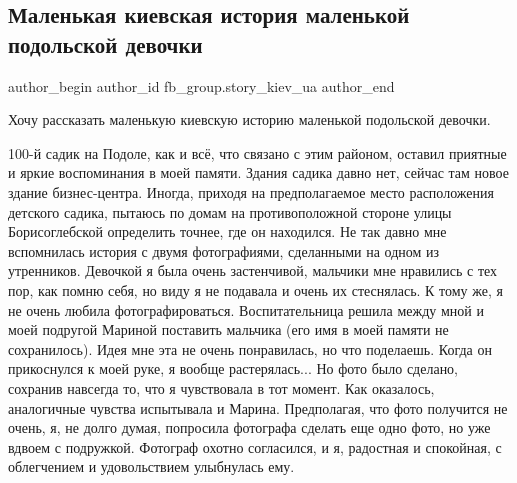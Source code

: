  
 
 
 
 
 
\subsection{Маленькая киевская история маленькой подольской девочки}
\label{sec:20_11_2021.fb.fb_group.story_kiev_ua.2.malenkaja_podolskaja_devochka}
 
\ifcmt
 author_begin
   author_id fb_group.story_kiev_ua
 author_end
\fi

Хочу рассказать маленькую киевскую историю маленькой подольской девочки. 

100-й садик на Подоле, как и всё, что связано с этим районом, оставил приятные
и яркие воспоминания в моей памяти. Здания садика давно нет, сейчас там новое
здание бизнес-центра. Иногда, приходя на предполагаемое место расположения
детского садика, пытаюсь по домам на противоположной стороне улицы
Борисоглебской определить точнее, где он находился. Не так давно мне
вспомнилась история с двумя фотографиями, сделанными на одном из утренников.
Девочкой я была очень застенчивой, мальчики мне нравились с тех пор, как помню
себя, но виду я не подавала и очень их стеснялась. К тому же, я не очень любила
фотографироваться. Воспитательница решила между мной и моей подругой Мариной
поставить мальчика (его имя в моей памяти не сохранилось). Идея мне эта не
очень понравилась, но что поделаешь. Когда он прикоснулся к моей руке, я вообще
растерялась... Но фото было сделано, сохранив навсегда то, что я чувствовала в
тот момент. Как оказалось, аналогичные чувства испытывала и Марина.
Предполагая, что фото получится не очень, я, не долго думая, попросила
фотографа сделать еще одно фото, но уже вдвоем с подружкой. Фотограф охотно
согласился, и я, радостная и спокойная, с облегчением и удовольствием
улыбнулась ему. 

\begin{multicols}{2}


\end{multicols}


